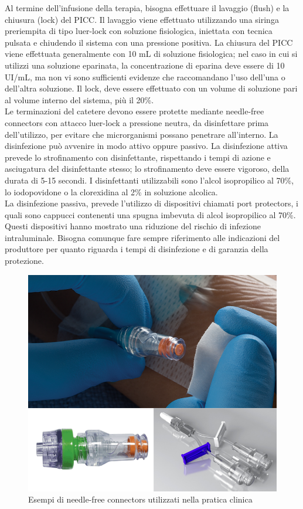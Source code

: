 Al termine dell’infusione della terapia, bisogna effettuare il lavaggio (flush) e la chiusura (lock) del PICC.
Il lavaggio viene effettuato utilizzando una siringa preriempita di tipo luer-lock con soluzione fisiologica, 
iniettata con tecnica pulsata e chiudendo il sistema con una pressione positiva. La chiusura del PICC viene effettuata 
generalmente con 10 mL di soluzione fisiologica; nel caso in cui si utilizzi una soluzione eparinata, la 
concentrazione di eparina deve essere di 10 UI/mL, ma non vi sono sufficienti evidenze che raccomandano l’uso 
dell’una o dell’altra soluzione. 
Il lock, deve essere effettuato con un volume di soluzione pari al volume interno del sistema, più il 20\%.\\
Le terminazioni del catetere devono essere protette mediante needle-free connectors con attacco luer-lock a pressione 
neutra, da disinfettare prima dell’utilizzo, per evitare che microrganismi possano penetrare 
all’interno. La disinfezione può avvenire in modo attivo oppure passivo. La disinfezione attiva prevede lo 
strofinamento con disinfettante, rispettando i tempi di azione e asciugatura del disinfettante stesso; 
lo strofinamento deve essere vigoroso, della durata di 5-15 secondi. I disinfettanti utilizzabili sono 
l’alcol isopropilico al 70\%, lo iodopovidone o la clorexidina al 2\% in soluzione alcolica\cite{AIOMCVC}.\\
La disinfezione passiva, prevede l’utilizzo di dispositivi chiamati port protectors, i quali sono cappucci contenenti 
una spugna imbevuta di alcol isopropilico al 70\%. Questi dispositivi hanno mostrato una riduzione del rischio di 
infezione intraluminale. Bisogna comunque fare sempre riferimento alle indicazioni del produttore per quanto 
riguarda i tempi di disinfezione e di garanzia della protezione\cite{AIOMCVC}.\\

\begin{figure}[H]
    \begin{center}
    \includegraphics[width=0.4\columnwidth]{img/needlefree.png}
    \end{center}
    \caption[Esempi di needle-free connectors utilizzati nella pratica clinica]{Esempi di needle-free connectors utilizzati nella pratica clinica
    \cite{img46}}

\end{figure}

